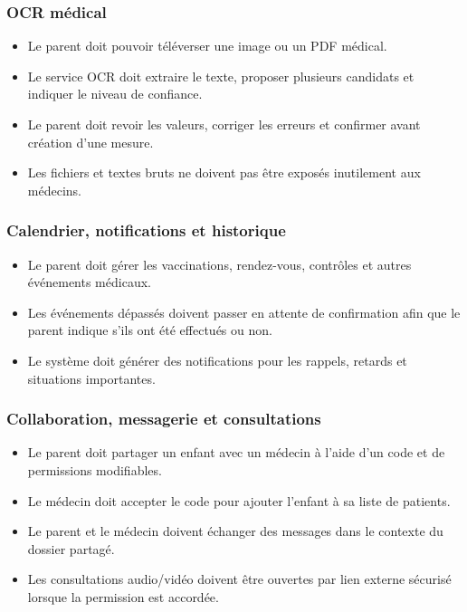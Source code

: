 \subsubsection*{OCR médical}
\begin{itemize}
    \item Le parent doit pouvoir téléverser une image ou un PDF médical.
    \item Le service OCR doit extraire le texte, proposer plusieurs candidats et indiquer le niveau de confiance.
    \item Le parent doit revoir les valeurs, corriger les erreurs et confirmer avant création d'une mesure.
    \item Les fichiers et textes bruts ne doivent pas être exposés inutilement aux médecins.
\end{itemize}

\subsubsection*{Calendrier, notifications et historique}
\begin{itemize}
    \item Le parent doit gérer les vaccinations, rendez-vous, contrôles et autres événements médicaux.
    \item Les événements dépassés doivent passer en attente de confirmation afin que le parent indique s'ils ont été effectués ou non.
    \item Le système doit générer des notifications pour les rappels, retards et situations importantes.
\end{itemize}

\subsubsection*{Collaboration, messagerie et consultations}
\begin{itemize}
    \item Le parent doit partager un enfant avec un médecin à l'aide d'un code et de permissions modifiables.
    \item Le médecin doit accepter le code pour ajouter l'enfant à sa liste de patients.
    \item Le parent et le médecin doivent échanger des messages dans le contexte du dossier partagé.
    \item Les consultations audio/vidéo doivent être ouvertes par lien externe sécurisé lorsque la permission est accordée.
\end{itemize}

